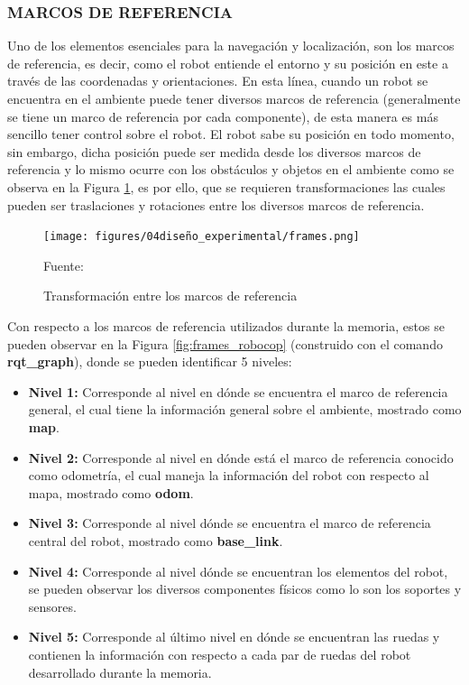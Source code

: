 \subsubsection{MARCOS DE REFERENCIA}
Uno de los elementos esenciales para la navegación y localización, son los marcos de referencia, es decir, como el robot entiende el entorno y su posición en este a través de las coordenadas y orientaciones. En esta línea, cuando un robot se encuentra en el ambiente puede tener diversos marcos de referencia (generalmente se tiene un marco de referencia por cada componente), de esta manera es más sencillo tener control sobre el robot.
El robot sabe su posición en todo momento, sin embargo, dicha posición puede ser medida desde los diversos marcos de referencia y lo mismo ocurre con los obstáculos y objetos en el ambiente como se observa en la Figura \ref{fig:frames_explication}, es por ello, que se requieren transformaciones las cuales pueden ser traslaciones y rotaciones entre los diversos marcos de referencia.
\begin{figure}[H]
\centering
\texttt{[image: figures/04diseño\_experimental/frames.png]}
\caption{\label{fig:frames_explication} Transformación entre los marcos de referencia} Fuente: \cite{anis_koubaa_robot_2016}
\end{figure}
Con respecto a los marcos de referencia utilizados durante la memoria, estos se pueden observar en la Figura \ref{fig:frames_robocop} (construido con el comando \textbf{rqt\_graph}), donde se pueden identificar 5 niveles:
\begin{itemize}
    \item \textbf{Nivel 1:} Corresponde al nivel en dónde se encuentra el marco de referencia general, el cual tiene la información general sobre el ambiente, mostrado como \textbf{map}.
    \item \textbf{Nivel 2:} Corresponde al nivel en dónde está el marco de referencia conocido como odometría, el cual maneja la información del robot con respecto al mapa, mostrado como \textbf{odom}.
    \item \textbf{Nivel 3:} Corresponde al nivel dónde se encuentra el marco de referencia central del robot, mostrado como \textbf{base\_link}.
    \item \textbf{Nivel 4:} Corresponde al nivel dónde se encuentran los elementos del robot, se pueden observar los diversos componentes físicos como lo son los soportes y sensores.
    \item \textbf{Nivel 5:} Corresponde al último nivel en dónde se encuentran las ruedas y contienen la información con respecto a cada par de ruedas del robot desarrollado durante la memoria.
\end{itemize}

